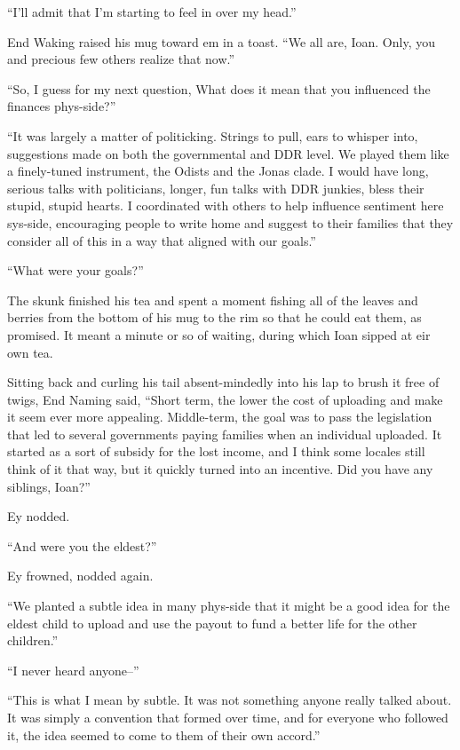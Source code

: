 ``I'll admit that I'm starting to feel in over my head.''

End Waking raised his mug toward em in a toast. ``We all are, Ioan. Only, you and precious few others realize that now.''

``So, I guess for my next question, What does it mean that you influenced the finances phys-side?''

``It was largely a matter of politicking. Strings to pull, ears to whisper into, suggestions made on both the governmental and DDR level. We played them like a finely-tuned instrument, the Odists and the Jonas clade. I would have long, serious talks with politicians, longer, fun talks with DDR junkies, bless their stupid, stupid hearts. I coordinated with others to help influence sentiment here sys-side, encouraging people to write home and suggest to their families that they consider all of this in a way that aligned with our goals.''

``What were your goals?''

The skunk finished his tea and spent a moment fishing all of the leaves and berries from the bottom of his mug to the rim so that he could eat them, as promised. It meant a minute or so of waiting, during which Ioan sipped at eir own tea.

Sitting back and curling his tail absent-mindedly into his lap to brush it free of twigs, End Naming said, ``Short term, the lower the cost of uploading and make it seem ever more appealing. Middle-term, the goal was to pass the legislation that led to several governments paying families when an individual uploaded. It started as a sort of subsidy for the lost income, and I think some locales still think of it that way, but it quickly turned into an incentive. Did you have any siblings, Ioan?''

Ey nodded.

``And were you the eldest?''

Ey frowned, nodded again.

``We planted a subtle idea in many phys-side that it might be a good idea for the eldest child to upload and use the payout to fund a better life for the other children.''

``I never heard anyone--''

``This is what I mean by subtle. It was not something anyone really talked about. It was simply a convention that formed over time, and for everyone who followed it, the idea seemed to come to them of their own accord.''


